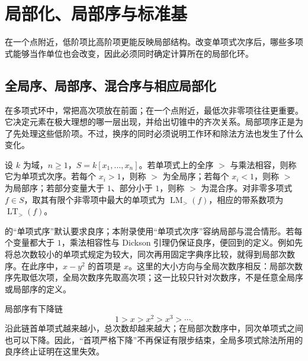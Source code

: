 
\section{局部化、局部序与标准基}
\label{b3:sec:F01}

在一个点附近，低阶项比高阶项更能反映局部结构。改变单项式次序后，哪些多项式能够当作单位也会改变，因此必须同时确定计算所在的局部化环。


\subsection{全局序、局部序、混合序与相应局部化}
\label{b3:subsec:F01:01}

在多项式环中，常把高次项放在前面；在一个点附近，最低次非零项往往更重要。它决定元素在极大理想的哪一层出现，并给出切锥中的齐次关系。局部项序正是为了先处理这些低阶项。不过，换序的同时必须说明工作环和除法方法也发生了什么变化。

\begin{definition}\label{b3:def:F-monomial-orders}
	设 \(k\) 为域，\(n\ge1\)，\(S=k[x_1,\ldots,x_n]\)。若单项式上的全序 \(>\) 与乘法相容，则称它为单项式次序。若每个 \(x_i>1\)，则称 \(>\) 为全局序；若每个 \(x_i<1\)，则称 \(>\) 为局部序；若部分变量大于 \(1\)、部分小于 \(1\)，则称 \(>\) 为混合序。对非零多项式 \(f\in S\)，取其有限个非零项中最大的单项式为 \(\operatorname{LM}_{>}(f)\)，相应的带系数项为 \(\operatorname{LT}_{>}(f)\)。
\end{definition}

的“单项式序”默认要求良序；本附录使用“单项式次序”容纳局部与混合情形。若每个变量都大于 \(1\)，乘法相容性与 Dickson 引理仍保证良序，便回到的定义。例如先将总次数较小的单项式规定为较大，同次再用固定字典序比较，就得到局部次数序。在此序中，\(x-y^2\) 的首项是 \(x\)。这里的大小方向与全局次数序相反：局部次数序先取低次项，全局次数序先取高次项；这一比较只针对次数序，不是任意全局序或局部序的定义。

\ProseParagraphBreak
局部序有下降链
\[
	1>x>x^2>x^3>\cdots.
\]
沿此链首单项式越来越小，总次数却越来越大；在局部次数序中，同次单项式之间也可以下降。因此，“首项严格下降”不再保证有限步结束，全局多项式除法所用的良序终止证明在这里失效。

